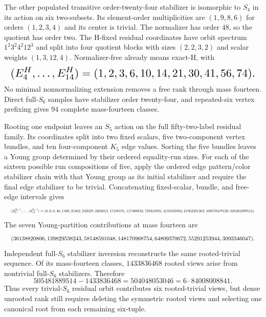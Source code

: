 \documentclass{article}
\newcommand{\fitmath}[1]{\resizebox{0.99\linewidth}{!}{$\displaystyle #1$}}
\begin{document}
The other populated transitive order-twenty-four stabilizer is isomorphic to
$S_4$ in its action on six two-subsets. Its element-order multiplicities are
$(1,9,8,6)$ for orders $(1,2,3,4)$ and its center is trivial. The normalizer has
order $48$, so the quotient has order two. The H-fixed residual coordinates have
orbit spectrum $1^2 3^2 4^2 12^3$ and split into four quotient blocks with
sizes $(2,2,3,2)$ and scalar weights $(1,3,12,4)$. Normalizer-free already means
exact-H, with
\begin{equation}
  \fitmath{%
    (E_4^H,\ldots,E_{14}^H)=(1,2,3,6,10,14,21,30,41,56,74).
  }
  \label{eq:optimization-crazy-sextuple-s6-full-transitive-s4-ranking}
\end{equation}
No minimal nonnormalizing extension removes a free rank through mass fourteen.
Direct full-$S_6$ samples have stabilizer order twenty-four, and repeated-six
vertex prefixing gives $94$ complete mass-fourteen classes.

Rooting one endpoint leaves an $S_5$ action on the full fifty-two-label residual
family. Its coordinates split into two fixed scalars, five two-component vertex
bundles, and ten four-component $K_5$ edge values. Sorting the five bundles
leaves a Young group determined by their ordered equality-run sizes. For each
of the sixteen possible run compositions of five, apply the ordered edge
pattern/color stabilizer chain with that Young group as its initial stabilizer
and require the final edge stabilizer to be trivial. Concatenating fixed-scalar,
bundle, and free-edge intervals gives
\begin{equation}
  \fitmath{%
    (R_0^{S_5,1},\ldots,R_{14}^{S_5,1})=
    (0,0,0,40,1340,21462,242629,2204012,17109191,117488832,
     729410921,4155525962,21962281262,108578479120,505481889514).
  }
  \label{eq:optimization-crazy-sextuple-s6-rooted-s5-trivial-ranking}
\end{equation}
The seven Young-partition contributions at mass fourteen are
\[
  \fitmath{%
    (36138820806,139829538243,58148591048,148170968754,
     64809370672,55291253944,3093346047).
  }
\]
Independent full-$S_6$ stabilizer inversion reconstructs the same rooted-trivial
sequence. Of its mass-fourteen classes, $1433836468$ rooted views arise from
nontrivial full-$S_6$ stabilizers. Therefore
\[
  505481889514-1433836468
    =504048053046=6\cdot84008008841.
\]
Thus every trivial-$S_6$ residual orbit contributes six rooted-trivial views,
but dense unrooted rank still requires deleting the symmetric rooted views and
selecting one canonical root from each remaining six-tuple.
\end{document}
